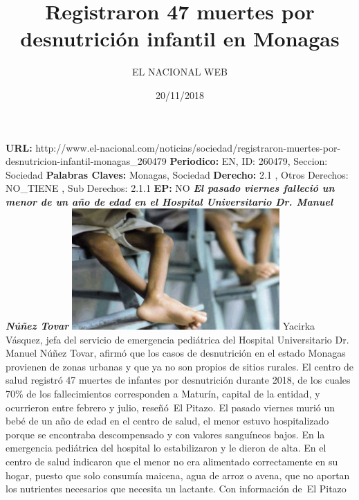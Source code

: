 \documentclass{article}%
\title{\textbf{Registraron 47 muertes por desnutrición infantil en Monagas}}%
\author{EL NACIONAL WEB}%
\date{20/11/2018}%
\begin{document}
%
\normalsize%
\maketitle%
\textbf{URL: }%
http://www.el{-}nacional.com/noticias/sociedad/registraron{-}muertes{-}por{-}desnutricion{-}infantil{-}monagas\_260479\newline%
%
\textbf{Periodico: }%
EN, %
ID: %
260479, %
Seccion: %
Sociedad\newline%
%
\textbf{Palabras Claves: }%
Monagas, Sociedad\newline%
%
\textbf{Derecho: }%
2.1%
, Otros Derechos: %
NO\_TIENE%
, Sub Derechos: %
2.1.1%
\newline%
%
\textbf{EP: }%
NO\newline%
\newline%
%
\textbf{\textit{El pasado viernes falleció un menor de un año de edad en el Hospital Universitario Dr. Manuel Núñez Tovar}}%
\newline%
\newline%
%
\includegraphics[width=300px]{192.jpg}%
\newline%
%
Yacirka Vásquez, jefa del servicio de emergencia pediátrica del Hospital Universitario Dr. Manuel Núñez Tovar, afirmó que los casos de desnutrición en el estado Monagas provienen de zonas urbanas y que ya no son propios de sitios rurales.%
\newline%
%
El centro de salud registró 47 muertes de infantes por desnutrición durante 2018, de los cuales 70\% de los fallecimientos corresponden a Maturín, capital de la entidad, y ocurrieron entre febrero y julio, reseñó~El Pitazo.%
\newline%
%
El pasado viernes murió un bebé de un año de edad en el centro de salud, el menor estuvo hospitalizado porque se encontraba descompensado y con valores sanguíneos bajos. En la emergencia pediátrica del hospital lo estabilizaron y le dieron de alta.%
\newline%
%
En el centro de salud indicaron que el menor no era alimentado correctamente en su hogar, puesto que solo consumía maicena, agua de arroz o avena, que no aportan los nutrientes necesarios que necesita un lactante.%
\newline%
%
Con información de~El Pitazo%
\newline%
%
\end{document}
